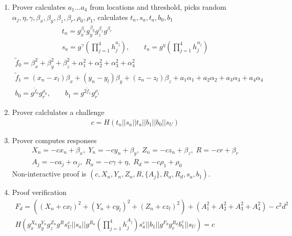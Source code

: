 \documentclass[a4paper,12pt]{article}
\begin{document}
\begin{enumerate}
\item
  Prover calculates $a_1 \dots a_4$ from locations and threshold,
  picks random $\alpha_j, \eta, \gamma, \beta_x, \beta_y, \beta_z, \beta_r, \rho_0, \rho_1$, %
  calculates $t_n, s_a, t_a, b_0, b_1$
\begin{gather}
  t_n = g_x^{\beta_x} g_y^{\beta_y} g_z^{\beta_z} g^{\beta_r} \\
  s_a = g^{\gamma} (\prod_{j=1}^4 h_j^{a_j}),  \qquad
  t_a = g^{\eta} (\prod_{j=1}^4 h_j^{\alpha_j})
\end{gather}
\begin{multline}
  \tilde f_0 = \beta_x^2 + \beta_y^2 +\beta_z^2 + \alpha_1^2 + \alpha_2^2 + \alpha_3^2 + \alpha_4^2  \\
  \tilde f_1 = (x_n - x_l) \beta_x  + (y_n - y_l) \beta_y  + (z_n - z_l) \beta_z + a_1 \alpha_1 + a_2 \alpha_2 + a_3 \alpha_3 + a_4 \alpha_4 \\
  b_0 = g^{\tilde f_0} g_r^{\rho_0},   \qquad
  b_1 = g^{2 \tilde f_1} g_r^{\rho_1}
\end{multline}

\item
  Prover calclulates a challenge
\begin{gather}
  c = H(t_n || s_a || t_a || b_1 || b_0 || s_U)
\end{gather}

\item
  Prover computes responses
\begin{multline}
  X_n = -c x_n + \beta_x,  \;
  Y_n = -c y_n + \beta_y,  \;
  Z_n = -c z_n + \beta_z,   \;
  R = -c r + \beta_r   \\
  A_j = -c a_j + \alpha_j, \;
  R_a = -c \gamma + \eta,   \;
  R_d = -c \rho_1 + \rho_0
\end{multline}
Non-interactive proof is
$(c, X_n, Y_n, Z_n, R, \{A_j\}, R_a, R_d, s_a, b_1)$.

\item
  Proof verification
\begin{multline}
\label{verf-chash}
  F_d = ((X_n + c x_l)^2 + (Y_n + c y_l)^2 + (Z_n + c z_l)^2) + (A_1^2 + A_2^2 + A_3^2 + A_4^2) - c^2 d^2 \\
  H(g_x^{X_n} g_y^{Y_n} g_z^{Z_n} g^{R} s_U^{c} ||
    s_a ||
    g^{R_a} (\prod_{j=1}^4 h_j^{A_j}) s_a^{c} ||
    b_1 ||
    g^{F_d} g_r^{R_d} b_1^c ||
    s_U)
  = c
\end{multline}

\end{enumerate}
\end{document}
